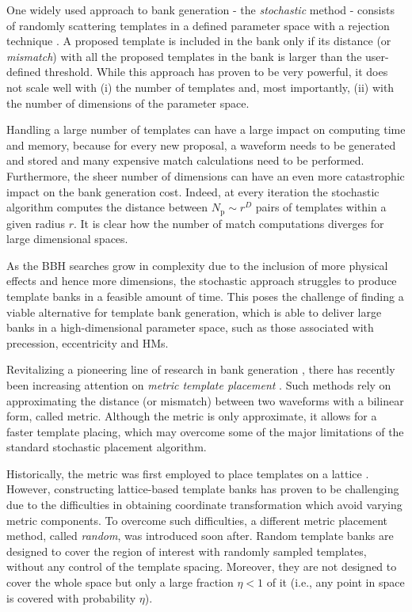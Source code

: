 \documentclass[twocolumn,showpacs,preprintnumbers,nofootinbib,prd,
superscriptaddress,10pt]{revtex4-2}
\begin{document}
One widely used approach to bank generation - the {\it stochastic} method \cite{Harry:2009ea, PhysRevD.80.104014, Ajith:2012mn} - consists of randomly scattering templates in a defined parameter space with a rejection technique \cite{DalCanton:2017ala, Mukherjee:2018yra, Indik:2016qky, Lenon:2021zac}. A proposed template is included in the bank only if its distance (or {\it mismatch}) with all the proposed templates in the bank is larger than the user-defined threshold.
While this approach has proven to be very powerful, it does not scale well with (i) the number of templates and, most importantly, (ii) with the number of dimensions of the parameter space.

Handling a large number of templates can have a large impact on computing time and memory, because for every new proposal, a waveform needs to be generated and stored and many expensive match calculations need to be performed.
Furthermore, the sheer number of dimensions can have an even more catastrophic impact on the bank generation cost. Indeed, at every iteration the stochastic algorithm computes the distance between $N_\text{p}\sim r^D$ pairs of templates within a given radius $r$. It is clear how the number of match computations diverges for large dimensional spaces.

As the BBH searches grow in complexity due to the inclusion of more physical effects and hence more dimensions, the stochastic approach struggles to produce template banks in a feasible amount of time.
This poses the challenge of finding a viable alternative for template bank generation, which is able to deliver large banks in a high-dimensional parameter space, such as those associated with precession, eccentricity and HMs.

Revitalizing a pioneering line of research in bank generation \cite{owen_metric, Messenger:2008ta, Prix:2007ks, Brown:2012qf, Keppel:2013uma}, there has recently been increasing attention on {\it metric template placement} \cite{Roy:2017oul, 2018cosp...42E2899R, Coogan:2022qxs, Hanna:2022zpk}.
Such methods rely on approximating the distance (or mismatch) between two waveforms with a bilinear form, called metric.
Although the metric is only approximate, it allows for a faster template placing, which may overcome some of the major limitations of the standard stochastic placement algorithm.

Historically, the metric was first employed to place templates on a lattice \cite{owen_metric, Prix:2007ks, Cokelaer:2007kx}. However, constructing lattice-based template banks has proven to be challenging due to the difficulties in  obtaining coordinate transformation which avoid varying metric components.
To overcome such difficulties, a different metric placement method, called {\it random}, was introduced \cite{Messenger:2008ta} soon after.
Random template banks are designed to cover the region of interest with randomly sampled templates, without any control of the template spacing. 
Moreover, they are not designed to cover the whole space but only a large fraction $\eta<1$ of it (i.e., any point in space is covered with probability $\eta$).
\end{document}

